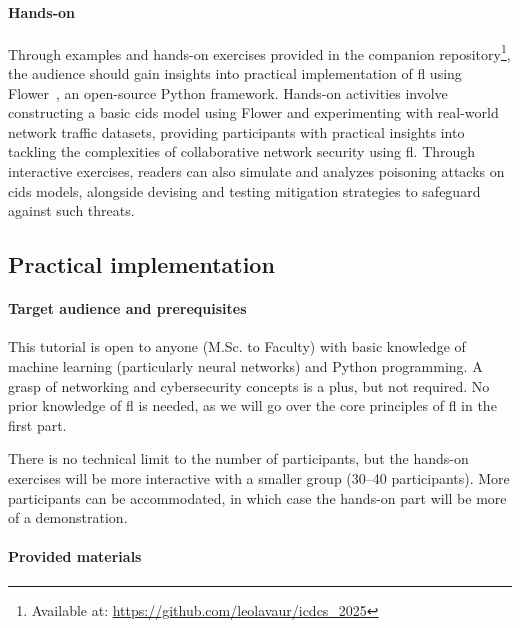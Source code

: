 \documentclass[conference]{IEEEtran}
\begin{document}
\paragraph*{Hands-on}

Through examples and hands-on exercises provided in the companion repository\footnote{Available at: \url{https://github.com/leolavaur/icdcs_2025}}, the audience should gain insights into practical implementation of \gls{fl} using Flower~\cite{beutel_Flowerfriendlyfederated_2020}, an open-source Python framework.
Hands-on activities involve constructing a basic \gls{cids} model using Flower and experimenting with real-world network traffic datasets, providing participants with practical insights into tackling the complexities of collaborative network security using \gls{fl}.
Through interactive exercises, readers can also simulate and analyzes poisoning attacks on \gls{cids} models, alongside devising and testing mitigation strategies to safeguard against such threats.

\subsection{Practical implementation}

\paragraph*{Target audience and prerequisites}

This tutorial is open to anyone (M.Sc.
to Faculty) with basic knowledge of machine learning (particularly neural networks) and Python programming.
A grasp of networking and cybersecurity concepts is a plus, but not required.
No prior knowledge of \gls{fl} is needed, as we will go over the core principles of \gls{fl} in the first part.

There is no technical limit to the number of participants, but the hands-on exercises will be more interactive with a smaller group (30--40 participants).
More participants can be accommodated, in which case the hands-on part will be more of a demonstration.

\paragraph*{Provided materials}
\end{document}
